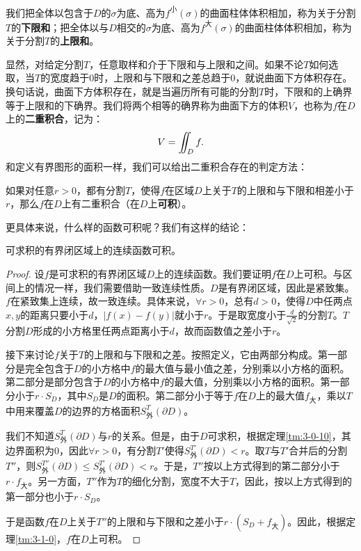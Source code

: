 \documentclass[12pt,UTF8,fontset=none]{ctexbook}
\begin{document}
我们把全体以包含于$D$的$\sigma$为底、高为$f^{\text{小}}(\sigma)$的曲面柱体体积相加，称为关于分割$T$的\textbf{下限和}；把全体以与$D$相交的$\sigma$为底、高为$f^{\text{大}}(\sigma)$的曲面柱体体积相加，称为关于分割$T$的\textbf{上限和}。

显然，对给定分割$T$，任意取样和介于下限和与上限和之间。如果不论$T$如何选取，当$T$的宽度趋于$0$时，上限和与下限和之差总趋于$0$，就说曲面下方体积存在。换句话说，曲面下方体积存在，就是当遍历所有可能的分割$T$时，下限和的上确界等于上限和的下确界。我们将两个相等的确界称为曲面下方的体积$V$，也称为$f$在$D$上的\textbf{二重积合}，记为：
$$ V = \int\!\!\!\!\!\int_{D} f. $$  %
和定义有界图形的面积一样，我们可以给出二重积合存在的判定方法：
\begin{tm}\label{tm:3-1-0}
    如果对任意$r>0$，都有分割$T$，使得$f$在区域$D$上关于$T$的上限和与下限和相差小于$r$，那么$f$在$D$上有二重积合（在$D$上\textbf{可积}）。
\end{tm}
更具体来说，什么样的函数可积呢？我们有这样的结论：
\begin{tm}
    可求积的有界闭区域上的连续函数可积。
\end{tm}
\begin{proof}
    设$f$是可求积的有界闭区域$D$上的连续函数。我们要证明$f$在$D$上可积。与区间上的情况一样，我们需要借助一致连续性质。$D$是有界闭区域，因此是紧致集。$f$在紧致集上连续，故一致连续。具体来说，$\forall r>0$，总有$d>0$，使得$D$中任两点$x,y$的距离只要小于$d$，$|f(x)-f(y)|$就小于$r$。于是取宽度小于$\displaystyle\frac{d}{\sqrt{2}}$的分割$T$。$T$分割$D$形成的小方格里任两点距离小于$d$，故而函数值之差小于$r$。
    
    接下来讨论$f$关于$T$的上限和与下限和之差。按照定义，它由两部分构成。第一部分是完全包含于$D$的小方格中$f$的最大值与最小值之差，分别乘以小方格的面积。第二部分是部分包含于$D$的小方格中$f$的最大值，分别乘以小方格的面积。第一部分小于$r\cdot S_D$，其中$S_D$是$D$的面积。第二部分小于等于$f$在$D$上的最大值$f_{\text{大}}$，乘以$T$中用来覆盖$D$的边界的方格面积$S_{\text{外}}^{T}(\partial D)$。

    我们不知道$S_{\text{外}}^{T}(\partial D)$与$r$的关系。但是，由于$D$可求积，根据定理\ref{tm:3-0-10}，其边界面积为$0$，因此$\forall r>0$，有分割$T'$使得$S_{\text{外}}^{T'}(\partial D)<r$。取$T$与$T'$合并后的分割$T''$，则$S_{\text{外}}^{T''}(\partial D)\leqslant S_{\text{外}}^{T'}(\partial D)<r$。于是，$T''$按以上方式得到的第二部分小于$r\cdot f_{\text{大}}$。另一方面，$T''$作为$T$的细化分割，宽度不大于$T$，因此，按以上方式得到的第一部分也小于$r\cdot S_D$。

    于是函数$f$在$D$上关于$T''$的上限和与下限和之差小于$r\cdot (S_D+f_{\text{大}})$。因此，根据定理\ref{tm:3-1-0}，$f$在$D$上可积。
\end{proof}
\end{document}
